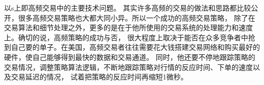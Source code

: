 以s上即高频交易中的主要技术问题。 其实许多高频的交易的做法和思路都比较公开，很多高频交易策略也大都大同小异。所以一个成功的高频交易策略，
除了在交易算法和细节处理之外，更多的是在于他所使用的交易系统的处理能力和速度上。确切的说，高频策略的成功与否，
很大程度上取决于能否在众多竞争者中抢到自己要的单子。在美国，高频交易者往往需要花大钱搭建交易网络和购买最好的硬件，使自己能够得到最快的数据和交易通道。
同时，他还要不停地跟踪策略的交易情况，调整策略算法逻辑，不断地跟踪策略对行情的反应时间、下单的速度以及交易延迟的情况，
试着把策略的反应时间再缩短1微秒。


